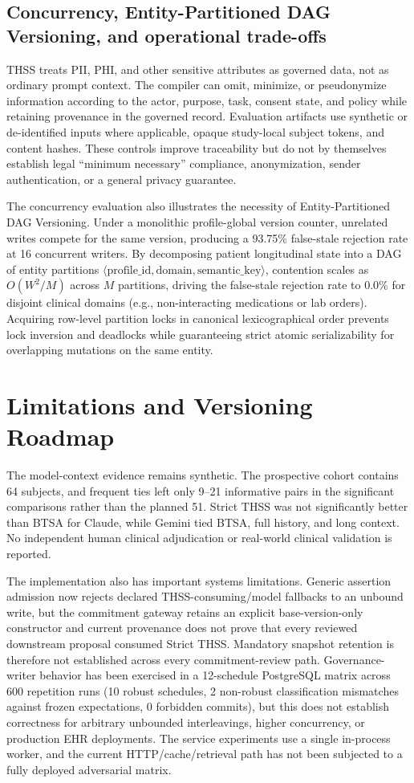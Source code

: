\documentclass[11pt]{article}
\begin{document}
\subsection{Concurrency, Entity-Partitioned DAG Versioning, and operational trade-offs}
THSS treats PII, PHI, and other sensitive attributes as governed data, not as ordinary prompt context. The compiler can omit, minimize, or pseudonymize information according to the actor, purpose, task, consent state, and policy while retaining provenance in the governed record. Evaluation artifacts use synthetic or de-identified inputs where applicable, opaque study-local subject tokens, and content hashes. These controls improve traceability but do not by themselves establish legal ``minimum necessary'' compliance, anonymization, sender authentication, or a general privacy guarantee.

The concurrency evaluation also illustrates the necessity of Entity-Partitioned DAG Versioning. Under a monolithic profile-global version counter, unrelated writes compete for the same version, producing a 93.75\% false-stale rejection rate at 16 concurrent writers. By decomposing patient longitudinal state into a DAG of entity partitions $\langle \text{profile\_id}, \text{domain}, \text{semantic\_key} \rangle$, contention scales as $O(W^2 / M)$ across $M$ partitions, driving the false-stale rejection rate to 0.0\% for disjoint clinical domains (e.g., non-interacting medications or lab orders). Acquiring row-level partition locks in canonical lexicographical order prevents lock inversion and deadlocks while guaranteeing strict atomic serializability for overlapping mutations on the same entity.

\section{Limitations and Versioning Roadmap}
The model-context evidence remains synthetic. The prospective cohort contains 64 subjects, and frequent ties left only 9--21 informative pairs in the significant comparisons rather than the planned 51. Strict THSS was not significantly better than BTSA for Claude, while Gemini tied BTSA, full history, and long context. No independent human clinical adjudication or real-world clinical validation is reported.

The implementation also has important systems limitations. Generic assertion admission now rejects declared THSS-consuming/model fallbacks to an unbound write, but the commitment gateway retains an explicit base-version-only constructor and current provenance does not prove that every reviewed downstream proposal consumed Strict THSS. Mandatory snapshot retention is therefore not established across every commitment-review path. Governance-writer behavior has been exercised in a 12-schedule PostgreSQL matrix across 600 repetition runs (10 robust schedules, 2 non-robust classification mismatches against frozen expectations, 0 forbidden commits), but this does not establish correctness for arbitrary unbounded interleavings, higher concurrency, or production EHR deployments. The service experiments use a single in-process worker, and the current HTTP/cache/retrieval path has not been subjected to a fully deployed adversarial matrix.
\end{document}
